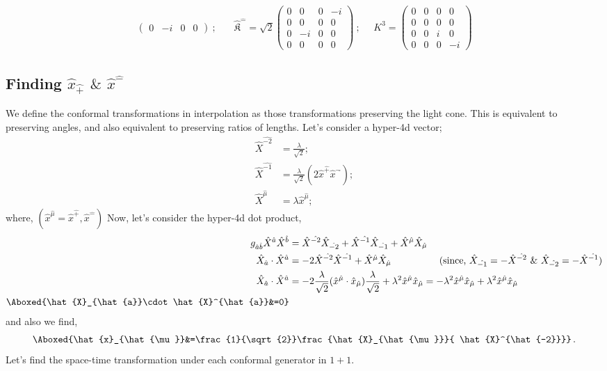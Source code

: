\documentclass[]{article}
\numberwithin{equation}{section}
\begin{document}
{{\begin{align}
\begin{pmatrix}
        0&-i&0&0
    \end{pmatrix}~;~~~~~~~~\hat{\mathfrak{K}}^{\hat{-}}=\sqrt{2}\begin{pmatrix}
        0&0&0&-i\\
        0&0&0&0\\
        0&-i&0&0\\
        0&0&0&0
    \end{pmatrix}~;~~~~~~K^{3}=\begin{pmatrix}
        0&0&0&0\\
        0&0&0&0\\
        0&0&i&0\\
        0&0&0&-i
    \end{pmatrix}
\end{align}
\subsection{Finding $\hat{x}_{\hat{+}}$ $\&$ $\hat{x}^{\hat{-}}$}
We define the conformal transformations in interpolation as those transformations preserving the light cone. This is equivalent to preserving angles, and also equivalent to preserving ratios of lengths. Let's consider a hyper-4d vector;
\begin{align}
    \hat{X}^{\hat{-2}}&=\frac{\lambda}{\sqrt{2}};\\
    \hat{X}^{\hat{-1}}&=\frac{\lambda}{\sqrt{2}}(2\hat{x}^{\hat{+}}\hat{x}^{-\hat{}});\\
     \hat{X}^{\hat{\mu}}&=\lambda \hat{x}^{\hat{\mu}};
\end{align}
where, $\left(\hat{x}^{\hat{\mu}}=\hat{x}^{\hat{+}},\hat{x}^{\hat{-}}\right)$ Now, let's consider the hyper-4d dot product,
\begin{align}
    g_{\hat{a}\hat{b}}\hat{X}^{\hat{a}} \hat{X}^{\hat{b}}&=\hat{X}^{\hat{-2}}\hat{X}_{\hat{-2}}+\hat{X}^{\hat{-1}}\hat{X}_{\hat{-1}}+\hat{X}^{\hat{\mu}}\hat{X}_{\hat{\mu}}\\
    \hat{X}_{\hat{a}}\cdot\hat{X}^{\hat{a}}&=-2\hat{X}^{\hat{-2}}\hat{X}^{\hat{-1}}+\hat{X}^{\hat{\mu}}\hat{X}_{\hat{\mu}}~~~~~~~~~~~~~~~(\text{since, }\hat{X}_{\hat{-1}}=-\hat{X}^{\hat{-2}}~\&~\hat{X}_{\hat{-2}}=-\hat{X}^{\hat{-1}})\\
     \hat{X}_{\hat{a}}\cdot\hat{X}^{\hat{a}}&=-2\frac{\lambda}{\sqrt{2}}(\hat{x}^{\hat{\mu}}\cdot\hat{x}_{\hat{\mu}})\frac{\lambda}{\sqrt{2}}+\lambda^2\hat{x}^{\hat{\mu}}\hat{x}_{\hat{\mu}}=-\lambda^2\hat{x}^{\hat{\mu}}\hat{x}_{\hat{\mu}}+\lambda^2\hat{x}^{\hat{\mu}}\hat{x}_{\hat{\mu}}\\
      \Aboxed{\hat{X}_{\hat{a}}\cdot\hat{X}^{\hat{a}}&=0}
\end{align}
and also we find,
\begin{align}
     \Aboxed{\hat{x}_{\hat{\mu}}&=\frac{1}{\sqrt{2}}\frac{\hat{X}_{\hat{\mu}}}{ \hat{X}^{\hat{-2}}}}\,.
\end{align}
Let's find the space-time transformation under each conformal generator in $1+1$.
}}
\end{document}
